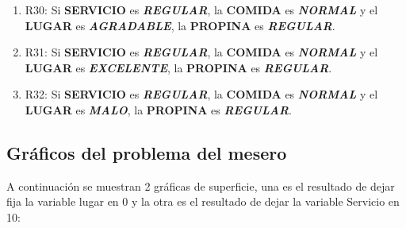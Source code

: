 \documentclass[11pt, letterpaper]{article}
\begin{document}
\begin{enumerate}
	\item R30: Si \textbf{SERVICIO} es \textbf{\textit{REGULAR}}, la \textbf{COMIDA} es \textbf{\textit{NORMAL}} y el \textbf{LUGAR} es \textbf{\textit{AGRADABLE}}, la \textbf{PROPINA} es \textbf{\textit{REGULAR}}.
	\item R31: Si \textbf{SERVICIO} es \textbf{\textit{REGULAR}}, la \textbf{COMIDA} es \textbf{\textit{NORMAL}} y el \textbf{LUGAR} es \textbf{\textit{EXCELENTE}}, la \textbf{PROPINA} es \textbf{\textit{REGULAR}}.
	\item R32: Si \textbf{SERVICIO} es \textbf{\textit{REGULAR}}, la \textbf{COMIDA} es \textbf{\textit{NORMAL}} y el \textbf{LUGAR} es \textbf{\textit{MALO}}, la \textbf{PROPINA} es \textbf{\textit{REGULAR}}.
\end{enumerate}

\newpage

\subsection{Gráficos del problema del mesero}

A continuación se muestran 2 gráficas de superficie, una es el resultado de dejar fija la variable lugar en 0 y la otra es el resultado de dejar la variable Servicio en 10:
\end{document}
